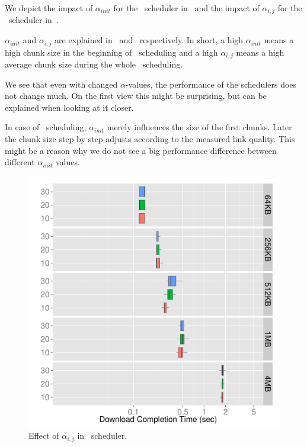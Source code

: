 We depict the impact of $\alpha_{init}$ for the \algalpha~scheduler in~ and the impact of $\alpha_{i,j}$ for the \algslice~scheduler in~. 

$\alpha_{init}$ and $\alpha_{i,j}$ are explained in~ and~ respectively. 
In short, a high $\alpha_{init}$ means a high chunk size in the beginning of \algalpha~scheduling and a high $\alpha_{i,j}$ means a high average chunk size during the whole \algslice~scheduling. 

We see that even with changed $\alpha$-values, the performance of the schedulers does not change much. 
On the first view this might be surprising, but can be explained when looking at it closer. 

In case of \algalpha~scheduling, $\alpha_{init}$ merely influences the size of the first chunks. 
Later the chunk size step by step adjusts according to the measured link quality. 
This might be a reason why we do not see a big performance difference between different $\alpha_{init}$ values. 


\begin{figure}[!htb]
    \begin{minipage}[t]{0.8\linewidth}
    \begin{center}
        \includegraphics[width=\linewidth]{Figures/dynamic-slice-alpha.pdf}
		\caption{\label{fig:evaluation-alpha-value-b}Effect of $\alpha_{i,j}$ in \algslice~scheduler.}
    \end{center}
    \end{minipage}
  \vspace*{-0.3cm}
\end{figure}

